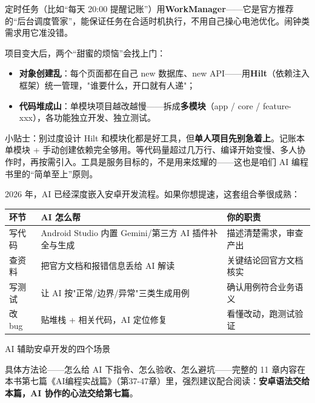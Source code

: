 定时任务（比如“每天 20:00 提醒记账”）用\textbf{WorkManager}——它是官方推荐的“后台调度管家”，能保证任务在合适时机执行，不用自己操心电池优化。闹钟类需求用它准没错。


项目变大后，两个“甜蜜的烦恼”会找上门：

\begin{itemize}
  \item \textbf{对象创建乱}：每个页面都在自己 new 数据库、new API——用\textbf{Hilt}（依赖注入框架）统一管理，"谁要什么，开口就有人递"；
  \item \textbf{代码堆成山}：单模块项目越改越慢——拆成\textbf{多模块}（app / core / feature-xxx），各功能独立开发、独立测试。
\end{itemize}

\begin{tcbinfo}{小贴士：别过度设计}
Hilt 和模块化都是好工具，但\textbf{单人项目先别急着上}。记账本单模块 + 手动创建依赖完全够用。等代码量超过几万行、编译开始变慢、多人协作时，再按需引入。工具是服务目标的，不是用来炫耀的——这也是咱们 AI 编程书里的“简单至上”原则。

\end{tcbinfo}


2026 年，AI 已经深度嵌入安卓开发流程。如果你想提速，这套组合拳很成熟：

\begin{center}
\begin{tabularx}{\linewidth}{|X|X|X|}
\hline
\textbf{环节} & \textbf{AI 怎么帮} & \textbf{你的职责} \tabularnewline
\hline
写代码 & Android Studio 内置 Gemini/第三方 AI 插件补全与生成 & 描述清楚需求，审查产出 \tabularnewline
查资料 & 把官方文档和报错信息丢给 AI 解读 & 关键结论回官方文档核实 \tabularnewline
写测试 & 让 AI 按"正常/边界/异常"三类生成用例 & 确认用例符合业务语义 \tabularnewline
改 bug & 贴堆栈 + 相关代码，AI 定位修复 & 看懂改动，跑测试验证 \tabularnewline
\hline
\end{tabularx}
\end{center}

\begin{center}\small\color{gray}AI 辅助安卓开发的四个场景\end{center}

具体方法论——怎么给 AI 下指令、怎么验收、怎么避坑——完整的 11 章内容在本书第七篇《AI编程实战篇》（第37-47章）里，强烈建议配合阅读：\textbf{安卓语法交给本篇，AI 协作的心法交给第七篇}。

